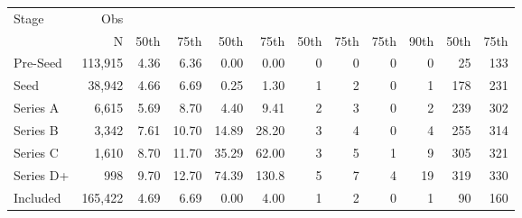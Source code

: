 \begin{tabular}{lrrrrrrrrrrr}
\toprule
Stage &	Obs &
 &
	&
	&
	&
	\\
{}          & N         & 50th  & 75th  & 50th  & 75th  & 50th  & 75th  & 75th  & 90th  & 50th  & 75th \\ \midrule
Pre-Seed    & 113,915   & 4.36  & 6.36  & 0.00  & 0.00  & 0     & 0     & 0     & 0     & 25    & 133 \\
Seed        & 38,942    & 4.66  & 6.69  & 0.25  & 1.30  & 1     & 2     & 0     & 1     & 178   & 231 \\
Series A    & 6,615     & 5.69  & 8.70  & 4.40  & 9.41  & 2     & 3     & 0     & 2     & 239   & 302 \\
Series B    & 3,342     & 7.61  & 10.70 & 14.89 & 28.20 & 3     & 4     & 0     & 4     & 255   & 314 \\
Series C    & 1,610     & 8.70  & 11.70 & 35.29 & 62.00 & 3     & 5     & 1     & 9     & 305   & 321 \\
Series D+   & 998       & 9.70  & 12.70 & 74.39 & 130.8 & 5     & 7     & 4     & 19    & 319   & 330 \\
Included    & 165,422   & 4.69  & 6.69  & 0.00  & 4.00  & 1     & 2     & 0     & 1     & 90    & 160 \\
\bottomrule
\end{tabular}
